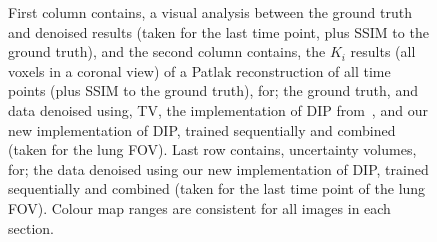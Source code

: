 \begin{figure}
        \captionsetup{singlelinecheck=false, justification=centering}
        \caption{
        First column contains, a visual analysis between the ground truth and denoised results (taken for the last time point, plus \gls{SSIM} to the ground truth), and the second column contains, the $K_i$ results (all voxels in a coronal view) of a Patlak reconstruction of all time points (plus \gls{SSIM} to the ground truth), for; the ground truth, and data denoised using, \gls{TV}, the implementation of \gls{DIP} from~\cite{Gong2019PETPrior}, and our new implementation of \gls{DIP}, trained sequentially and combined (taken for the lung \gls{FOV}). Last row contains, uncertainty volumes, for; the data denoised using our new implementation of \gls{DIP}, trained sequentially and combined (taken for the last time point of the lung \gls{FOV}). Colour map ranges are consistent for all images in each section.}
        
        \label{fig:visual_analysis}
        
    \end{figure}
    
